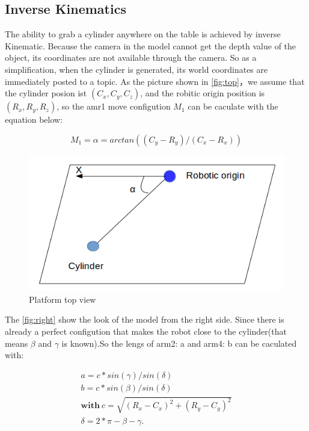 \subsection{Inverse Kinematics}

The ability to grab a cylinder anywhere on the table is achieved by inverse Kinematic. Because the camera in the model cannot get the depth value of the object, its coordinates are not available through the camera. So as a simplification, when the cylinder is generated, its world coordinates are immediately posted to a topic. As the picture shown in \autoref{fig:top}，we assume that the cylinder posion ist $(C_x, C_y, C_z)$, and the robitic origin position is  $(R_x, R_y, R_z)$, so the amr1 move configution $M_1$ can be caculate with the equation below:


\begin{equation}
\label{simple_equation}
M_1=\alpha = arctan((C_y-R_y)/(C_x-R_x))
\end{equation}









\begin{figure}[htpb]
\centering
	\includegraphics[width=0.96\linewidth]{figures/top_view.png} 
	\caption{Platform top view}
	\vspace{-0.4cm}
	\label{fig:top}
\end{figure}


The \autoref{fig:right} show the look of the model from the right side. Since there is already a perfect configution that makes the robot close to the cylinder(that means $\beta$ and $\gamma$ is known).So the lengs of arm2: a and arm4: b can be caculated with:

\begin{equation}
\begin{aligned}
a=c*sin(\gamma)/sin(\delta)\\b=c*sin(\beta)/sin(\delta)\\ 
\textbf{with}\ c=\sqrt{(R_x-C_x)^2+(R_y-C_y)^2}\\\delta=2*\pi-\beta-\gamma.
\end{aligned}
\end{equation}



